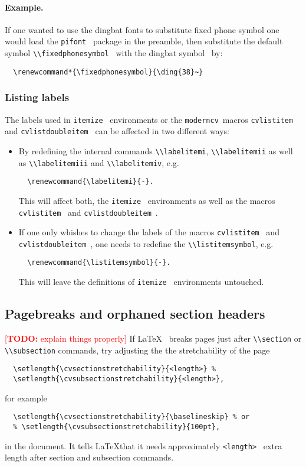 \documentclass[a4paper,11pt]{article}
\newcommand{\todox}[1]{\textcolor{red}{[\textbf{TODO:} #1]}}
\newcommand{\code}[1]{\lstinline!#1!}
\newcommand{\Code}[1]{\lstinline!#1!~} %
\newcommand{\Moderncv}{\Code{moderncv}}
\newcommand{\latex}{\LaTeX}
\begin{document}
\paragraph{Example.}
If one wanted to use the dingbat fonts to substitute fixed phone symbol one would load the \Code{pifont} package in the preamble, then substitute the default symbol \Code{\\fixedphonesymbol} with the dingbat symbol \ by:
\begin{lstlisting}
  \renewcommand*{\fixedphonesymbol}{\ding{38}~}
\end{lstlisting} 

\subsubsection{Listing labels}
The labels used in \Code{itemize} environments or the \Moderncv macros \code{cvlistitem} and \Code{cvlistdoubleitem} can be affected in two different ways:

\begin{itemize}
 \item By redefining the internal commands \code{\\labelitemi}, \code{\\labelitemii} as well as
  \code{\\labelitemiii} and \code{\\labelitemiv}, e.g. 
  \begin{lstlisting}
  \renewcommand{\labelitemi}{-}.
  \end{lstlisting}
  This will affect both, the \Code{itemize} environments as well as the macros \Code{cvlistitem} and \Code{cvlistdoubleitem}.
  \item If one only whishes to change the labels of the macros \Code{cvlistitem} and \Code{cvlistdoubleitem}, one needs to redefine the \code{\\listitemsymbol}, e.g.
\begin{lstlisting}
  \renewcommand{\listitemsymbol}{-}.
\end{lstlisting}
This will leave the definitions of \Code{itemize} environments untouched.
\end{itemize}

\subsection{Pagebreaks and orphaned section headers}
\todox{explain things properly}
If \latex~ breaks pages just after \code{\\section} or \code{\\subsection} commands, try adjusting
the the stretchability of the page
\begin{lstlisting}
  \setlength{\cvsectionstretchability}{<length>} %
  \setlength{\cvsubsectionstretchability}{<length>},
\end{lstlisting}
for example
\begin{lstlisting}
  \setlength{\cvsectionstretchability}{\baselineskip} % or
  % \setlength{\cvsubsectionstretchability}{100pt},
\end{lstlisting}
in the document. It tells \latex that it needs approximately \Code{<length>} extra length after 
section and subsection commands. 
\end{document}

